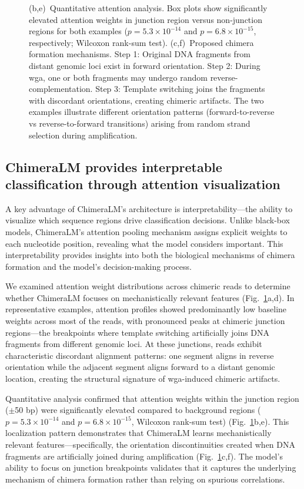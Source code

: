 \documentclass[pdflatex,sn-nature,lineno]{sn-jnl}%
\theoremstyle{thmstyleone}%
\theoremstyle{thmstyletwo}%
\theoremstyle{thmstylethree}%
\begin{document}
\begin{figure}[H]
{		(b,e)~Quantitative attention analysis. Box plots show significantly elevated attention weights in junction region versus non-junction regions for both examples ($p = 5.3 \times 10^{-14}$ and $p = 6.8 \times 10^{-15}$, respectively; Wilcoxon rank-sum test).
		(c,f)~Proposed chimera formation mechanisms. Step 1: Original DNA fragments from distant genomic loci exist in forward orientation. Step 2: During \gls{wga}, one or both fragments may undergo random reverse-complementation. Step 3: Template switching joins the fragments with discordant orientations, creating chimeric artifacts. The two examples illustrate different orientation patterns (forward-to-reverse vs reverse-to-forward transitions) arising from random strand selection during amplification.
	}\label{fig:figure4}
\end{figure}

\subsection*{ChimeraLM provides interpretable classification through attention visualization}

A key advantage of ChimeraLM's architecture is interpretability—the ability to visualize which sequence regions drive classification decisions.
Unlike black-box models, ChimeraLM's attention pooling mechanism assigns explicit weights to each nucleotide position, revealing what the model considers important.
This interpretability provides insights into both the biological mechanisms of chimera formation and the model's decision-making process.

We examined attention weight distributions across chimeric reads to determine whether ChimeraLM focuses on mechanistically relevant features (Fig.~\ref{fig:figure4}a,d).
In representative examples, attention profiles showed predominantly low baseline weights across most of the reads, with pronounced peaks at chimeric junction regions—the breakpoints where template switching artificially joins DNA fragments from different genomic loci. 
At these junctions, reads exhibit characteristic discordant alignment patterns: one segment aligns in reverse orientation while the adjacent segment aligns forward to a distant genomic location, creating the structural signature of \gls{wga}-induced chimeric artifacts.

Quantitative analysis confirmed that attention weights within the junction region ($\pm$50 bp) were significantly elevated compared to background regions ($p = 5.3 \times 10^{-14}$ and $p = 6.8 \times 10^{-15}$, Wilcoxon rank-sum test) (Fig.~\ref{fig:figure4}b,e).
This localization pattern demonstrates that ChimeraLM learns mechanistically relevant features—specifically, the orientation discontinuities created when DNA fragments are artificially joined during amplification (Fig.~\ref{fig:figure4}c,f). 
The model's ability to focus on junction breakpoints validates that it captures the underlying mechanism of chimera formation rather than relying on spurious correlations.
\end{document}
